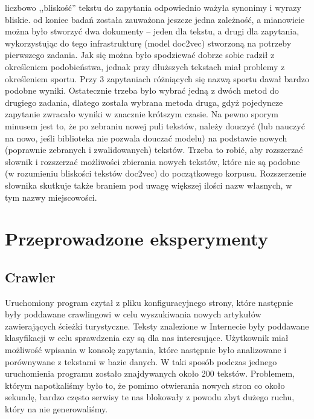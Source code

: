 \documentclass[titlepage]{article}
\begin{document}
liczbowo ,,bliskość'' tekstu do zapytania odpowiednio ważyła synonimy i wyrazy bliskie.
od koniec badań została zauważona jeszcze jedna zależność, a mianowicie można było stworzyć dwa dokumenty -- jeden dla tekstu, a drugi dla zapytania, wykorzystując do tego infrastrukturę (model doc2vec) stworzoną na potrzeby pierwszego zadania. Jak się można było spodziewać dobrze sobie radził z określeniem podobieństwa, jednak przy dłuższych tekstach miał problemy z określeniem sportu. Przy 3 zapytaniach różniących się nazwą sportu dawał bardzo podobne wyniki. 
Ostatecznie trzeba było wybrać jedną z dwóch metod do drugiego zadania, dlatego została wybrana metoda druga, gdyż pojedyncze zapytanie zwracało wyniki w znacznie krótszym czasie. Na pewno sporym minusem jest to, że po zebraniu nowej puli tekstów, należy douczyć (lub nauczyć na nowo, jeśli biblioteka nie pozwala douczać modelu) na podstawie nowych (poprawnie zebranych i zwalidowanych) tekstów. Trzeba to robić, aby rozszerzać słownik i rozszerzać możliwości zbierania nowych tekstów, które nie są podobne (w rozumieniu bliskości tekstów doc2vec) do początkowego korpusu. Rozszerzenie słownika skutkuje także braniem pod uwagę większej ilości nazw własnych, w tym nazwy miejscowości.



\section{Przeprowadzone eksperymenty}
\subsection{Crawler}
Uruchomiony program czytał z pliku konfiguracyjnego strony, które następnie były poddawane crawlingowi w celu wyszukiwania nowych artykułów zawierających ścieżki turystyczne. Teksty znalezione w Internecie były poddawane klasyfikacji w celu sprawdzenia czy są dla nas interesujące. Użytkownik miał możliwość wpisania w konsolę zapytania, które następnie było analizowane i porównywane z tekstami w bazie danych. W taki sposób podczas jednego uruchomienia programu zostało znajdywanych około 200 tekstów. Problemem, którym napotkaliśmy było to, że pomimo otwierania nowych stron co około sekundę, bardzo często serwisy te nas blokowały z powodu zbyt dużego ruchu, który na nie generowaliśmy.
\end{document}
